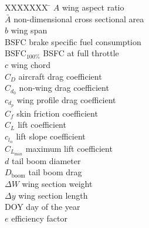\begin{multicols}{2}
\small

\begin{tabbing}
  XXXXXXX \= \kill%
$A$ \> wing aspect ratio \\
$\bar{A}$ \> non-dimensional cross sectional area \\
$b$ \> wing span \\ %
BSFC \> brake specific fuel consumption \\ %
$\text{BSFC}_{100\%}$ \> BSFC at full throttle \\ %
$c$ \> wing chord \\ %
$C_D$ \> aircraft drag coefficient \\
$C_{d_0}$ \> non-wing drag coefficient \\
\DIFdelbegin {}%
\DIFdelend %
$c_{d_p}$ \> wing profile drag coefficient \\
\DIFdelbegin {}%
\DIFdelend %
$C_f$ \> skin friction coefficient \\
$C_L$ \> lift coefficient \\
$c_{l_{\alpha}}$ \> lift slope coefficient \\
$C_{L_{\text{max}}}$ \> maximum lift coefficient \\
$d$ \> tail boom diameter \\ %
$D_{\text{boom}}$ \> tail boom drag \\%
$\Delta W$ \> wing section weight \\ %
$\Delta y$ \> wing section length \\ %
DOY \> day of the year \\
$e$ \> \DIFdelbegin {}\DIFdelend \DIFaddbegin {}\DIFaddend efficiency factor \\

\end{tabbing}
\end{multicols}
